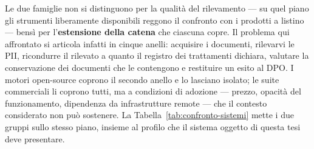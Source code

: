Le due famiglie non si distinguono per la qualità del rilevamento --- su quel piano gli strumenti liberamente disponibili reggono il confronto con i prodotti a listino --- bensì per l'\textbf{estensione della catena} che ciascuna copre. Il problema qui affrontato si articola infatti in cinque anelli: acquisire i documenti, rilevarvi le PII, ricondurre il rilevato a quanto il registro dei trattamenti dichiara, valutare la conservazione dei documenti che le contengono e restituire un esito al DPO. I motori open-source coprono il secondo anello e lo lasciano isolato; le suite commerciali li coprono tutti, ma a condizioni di adozione --- prezzo, opacità del funzionamento, dipendenza da infrastrutture remote --- che il contesto considerato non può sostenere. La Tabella~\ref{tab:confronto-sistemi} mette i due gruppi sullo stesso piano, insieme al profilo che il sistema oggetto di questa tesi deve presentare.

